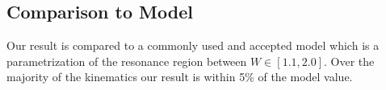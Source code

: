 \subsection{Comparison to Model}
Our result is compared to a commonly used and accepted model which is a parametrization of the resonance region between $W \in [1.1, 2.0]$.  Over the majority of the kinematics our result is within 5\% of the model value.  



%
%

